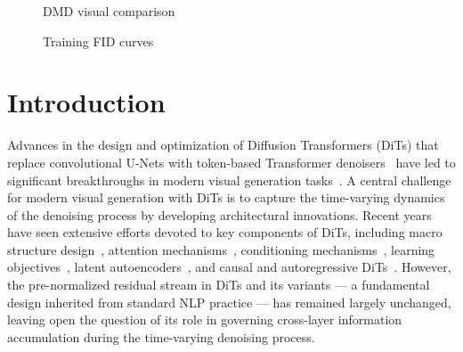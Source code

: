 \documentclass{llmxive}
\begin{document}
\vspace{-1.7em}
\begin{center}
\captionsetup{type=figure}
\centering

\begin{minipage}{0.84\textwidth}
\centering

\begin{subfigure}[t]{0.48\linewidth}
\vspace{13pt}
\centering
\hspace*{5pt}%

\caption{DMD visual comparison}
\label{fig:visual_comparison}
\end{subfigure}
\hfill
\begin{subfigure}[t]{0.48\linewidth}
\vspace{0pt}
\centering

\caption{Training FID curves}
\label{fig:fid_curve}
\end{subfigure}

\end{minipage}

\caption{Overview of the main empirical results. (a) Our method preserves high-frequency details during DMD. (b) Training FID curves on ImageNet $256\times256$.}
\label{fig:fid_training_curve}
\end{center}


\vspace{-0.5em}
\section{Introduction}  \label{sec:introduction}
Advances in the design and optimization of Diffusion Transformers (DiTs) that replace convolutional U-Nets with token-based Transformer denoisers~\citep{peebles2023scalable} have led to significant breakthroughs in modern visual generation tasks~\citep{wu2025qwen,kong2024hunyuanvideo,flux2024,hacohen2026ltx,cai2025z,seedream2025seedream}. A central challenge for modern visual generation with DiTs is to capture the time-varying dynamics of the denoising process by developing architectural innovations. Recent years have seen extensive efforts devoted to key components of DiTs, including macro structure design~\citep{bao2023all,peebles2023scalable,esser2024scaling,li2024hunyuandit}, attention mechanisms~\citep{xie2024sana,chen2023pixart,peebles2023scalable}, conditioning mechanisms~\citep{tan2025ominicontrol,zhang2025easycontrol}, learning objectives~\citep{yu2025repa,leng2025repae}, latent autoencoders~\citep{yao2025reconstruction,chen2024deep,zheng2025diffusion}, and causal and autoregressive DiTs~\citep{deng2024causal,huang2025self,cheng2025playing}. However, the pre-normalized residual stream in DiTs and its variants --- a fundamental design inherited from standard NLP practice --- has remained largely unchanged, leaving open the question of its role in governing cross-layer information accumulation during the time-varying denoising process.
\end{document}
